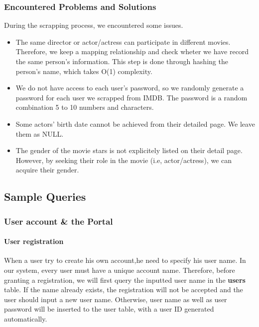 \begin{CJK*}{UTF8}{gbsn}
\subsubsection{Encountered Problems and Solutions}
During the scrapping process, we encountered some issues.
\begin{itemize}
    \item The same director or actor/actress can participate in different movies. Therefore, we keep a mapping relationship and check wheter we have record the same person's information. This step is done through hashing the person's name, which takes O(1) complexity.
    \item We do not have access to each user's password, so we randomly generate a password for each user we scrapped from IMDB. The password is a random combination 5 to 10 numbers and characters.
    \item Some actors' birth date cannot be achieved from their detailed page. We leave them as NULL.
    \item The gender of the movie stars is not explicitely listed on their detail page. However, by seeking their role in the movie (i.e, actor/actress), we can acquire their gender.
\end{itemize}
\subsection{Sample Queries}
\subsubsection{User account \& the Portal}
\paragraph{User registration}
When a user try to create his own account,he need to specify his user name. In our system, every user must have a unique account name. Therefore, before granting a registration, we will first query the inputted user name in the \textbf{users} table. If the name already exists, the registration will not be accepted and the user should input a new user name. Otherwise, user name as well as user password will be inserted to the user table, with a user ID generated automatically.




\end{CJK*}
